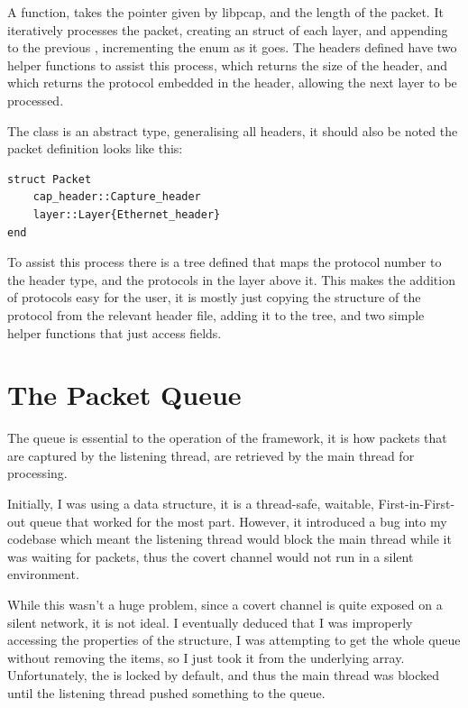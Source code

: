 A function,  takes the pointer given by libpcap, and the length of the packet. It iteratively processes the packet, creating an  struct of each layer, and appending to the previous , incrementing the  enum as it goes. The headers defined have two helper functions to assist this process,  which returns the size of the header, and  which returns the protocol embedded in the header, allowing the next layer to be processed.

The  class is an abstract type, generalising all headers, it should also be noted the packet definition looks like this:

\begin{lstlisting}[language=JuliaLocal, style=julia]
struct Packet
    cap_header::Capture_header
    layer::Layer{Ethernet_header}
end
\end{lstlisting}

To assist this process there is a tree defined that maps the protocol number to the header type, and the protocols in the layer above it. This makes the addition of protocols easy for the user, it is mostly just copying the structure of the protocol from the relevant header file, adding it to the tree, and two simple helper functions that just access fields.


\section{The Packet Queue}
\label{sec:queue}

The queue is essential to the operation of the framework, it is how packets that are captured by the listening thread, are retrieved by the main thread for processing.

Initially, I was using a  data structure, it is a thread-safe, waitable, First-in-First-out queue \citep{julia} that worked for the most part. However, it introduced a bug into my codebase which meant the listening thread would block the main thread while it was waiting for packets, thus the covert channel would not run in a silent environment.

While this wasn't a huge problem, since a covert channel is quite exposed on a silent network, it is not ideal. I eventually deduced that I was improperly accessing the properties of the structure, I was attempting to get the whole queue without removing the items, so I just took it from the underlying array. Unfortunately, the  is locked by default, and thus the main thread was blocked until the listening thread pushed something to the queue.

